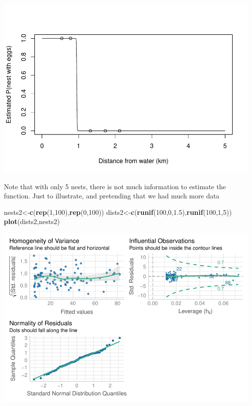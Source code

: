 \documentclass[
]{book}
\newenvironment{Shaded}{\begin{snugshade}}{\end{snugshade}}
\newcommand{\DecValTok}[1]{\textcolor[rgb]{0.00,0.00,0.81}{#1}}
\newcommand{\FloatTok}[1]{\textcolor[rgb]{0.00,0.00,0.81}{#1}}
\newcommand{\FunctionTok}[1]{\textcolor[rgb]{0.13,0.29,0.53}{\textbf{#1}}}
\newcommand{\NormalTok}[1]{#1}
\newcommand{\OtherTok}[1]{\textcolor[rgb]{0.56,0.35,0.01}{#1}}
\begin{document}
\includegraphics{ECOMODbook_files/figure-latex/ch13.36-1.pdf}

Note that with only 5 nests, there is not much information to estimate the function. Just to illustrate, and pretending that we had much more data

\begin{Shaded}
\begin{Highlighting}[]
\NormalTok{nests2}\OtherTok{\textless{}{-}}\FunctionTok{c}\NormalTok{(}\FunctionTok{rep}\NormalTok{(}\DecValTok{1}\NormalTok{,}\DecValTok{100}\NormalTok{),}\FunctionTok{rep}\NormalTok{(}\DecValTok{0}\NormalTok{,}\DecValTok{100}\NormalTok{))}
\NormalTok{dists2}\OtherTok{\textless{}{-}}\FunctionTok{c}\NormalTok{(}\FunctionTok{runif}\NormalTok{(}\DecValTok{100}\NormalTok{,}\DecValTok{0}\NormalTok{,}\FloatTok{1.5}\NormalTok{),}\FunctionTok{runif}\NormalTok{(}\DecValTok{100}\NormalTok{,}\DecValTok{1}\NormalTok{,}\DecValTok{5}\NormalTok{))}
\FunctionTok{plot}\NormalTok{(dists2,nests2)}
\end{Highlighting}
\end{Shaded}

\includegraphics{ECOMODbook_files/figure-latex/unnamed-chunk-6-1.pdf}
\end{document}
